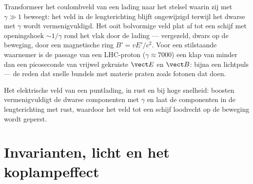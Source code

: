 \begin{example}\label{ex:b3:covariant-electromagnetism:pancake}
Transformeer het coulombveld van een lading naar het stelsel waarin zij
met $\gamma \gg 1$ beweegt: het veld in de lengterichting blijft
ongewijzigd terwijl het dwarse met $\gamma$ wordt vermenigvuldigd. Het
ooit bolvormige veld plat af tot een schijf met openingshoek $\sim 1/\gamma$ rond het vlak door de lading --- vergezeld, dwars op de
beweging, door een magnetische ring $B' = vE'/c^2$. Voor een stilstaande
waarnemer is de passage van een LHC-proton ($\gamma \approx 7000$) een
klap van minder dan een picoseconde van vrijwel gekruiste $\vect E$ en
$\vect B$: bijna een lichtpuls --- de reden dat snelle bundels met
materie praten zoals fotonen dat doen.
\end{example}

\begin{omfigure}

{\small Het elektrische veld van een puntlading, in rust en bij hoge
snelheid: boosten vermenigvuldigt de dwarse componenten met $\gamma$ en
laat de componenten in de lengterichting met rust, waardoor het veld tot
een schijf loodrecht op de beweging wordt geperst.}
\end{omfigure}

\section{Invarianten, licht en het koplampeffect}

